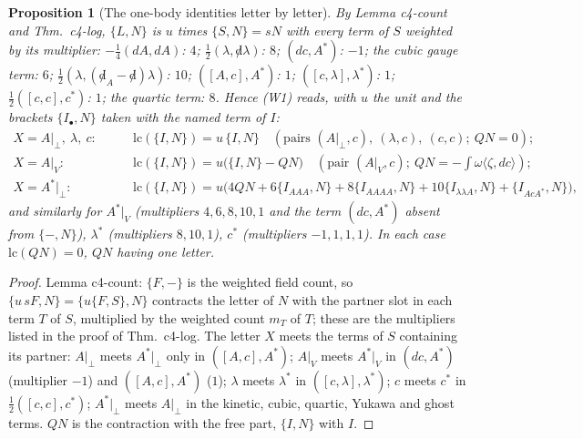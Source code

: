 \documentclass[11pt]{article}
\numberwithin{equation}{section}
\theoremstyle{plain}
\newtheorem{proposition}[theorem]{Proposition}
\theoremstyle{definition}
\begin{document}
\begin{proposition}[The one-body identities letter by letter]
\label{prop:tl-W1}
By Lemma c4-count and Thm.~c4-log, $\{L,N\}$ is $u$ times $\{S,N\}=sN$ with every term of $S$ weighted by its multiplier: $-\tfrac14(dA,dA)$: $4$; $\tfrac12(\lambda,{\not d}\lambda)$: $8$; $(dc,A^*)$: $-1$; the cubic gauge term: $6$; $\tfrac12(\lambda,({\not d}_A-{\not d})\lambda)$: $10$; $([A,c],A^*)$: $1$; $([c,\lambda],\lambda^*)$: $1$; $\tfrac12([c,c],c^*)$: $1$; the quartic term: $8$. Hence (W1) reads, with $u$ the unit and the brackets $\{I_\bullet,N\}$ taken with the named term of $I$:
\[
\begin{aligned}
X=A|_\perp,\ \lambda,\ c:&\qquad \mathrm{lc}(\{I,N\})=u\,\{I,N\}\quad(\text{pairs }(A|_\perp,c),\ (\lambda,c),\ (c,c);\ QN=0);\\
X=A|_V:&\qquad \mathrm{lc}(\{I,N\})=u\big(\{I,N\}-QN\big)\quad(\text{pair }(A|_V,c);\ QN=-\textstyle\int\omega\langle\zeta,dc\rangle);\\
X=A^*|_\perp:&\qquad \mathrm{lc}(\{I,N\})=u\big(4QN+6\{I_{AAA},N\}+8\{I_{AAAA},N\}+10\{I_{\lambda\lambda A},N\}+\{I_{AcA^*},N\}\big),
\end{aligned}
\]
and similarly for $A^*|_V$ (multipliers $4,6,8,10,1$ and the term $(dc,A^*)$ absent from $\{-,N\}$), $\lambda^*$ (multipliers $8,10,1$), $c^*$ (multipliers $-1,1,1,1$). In each case $\mathrm{lc}(QN)=0$, $QN$ having one letter.
\end{proposition}

\begin{proof}
Lemma c4-count: $\{F,-\}$ is the weighted field count, so $\{u\,sF,N\}=\{u\{F,S\},N\}$ contracts the letter of $N$ with the partner slot in each term $T$ of $S$, multiplied by the weighted count $m_T$ of $T$; these are the multipliers listed in the proof of Thm.~c4-log. The letter $X$ meets the terms of $S$ containing its partner: $A|_\perp$ meets $A^*|_\perp$ only in $([A,c],A^*)$; $A|_V$ meets $A^*|_V$ in $(dc,A^*)$ (multiplier $-1$) and $([A,c],A^*)$ ($1$); $\lambda$ meets $\lambda^*$ in $([c,\lambda],\lambda^*)$; $c$ meets $c^*$ in $\tfrac12([c,c],c^*)$; $A^*|_\perp$ meets $A|_\perp$ in the kinetic, cubic, quartic, Yukawa and ghost terms. $QN$ is the contraction with the free part, $\{I,N\}$ with $I$.
\end{proof}
\end{document}
